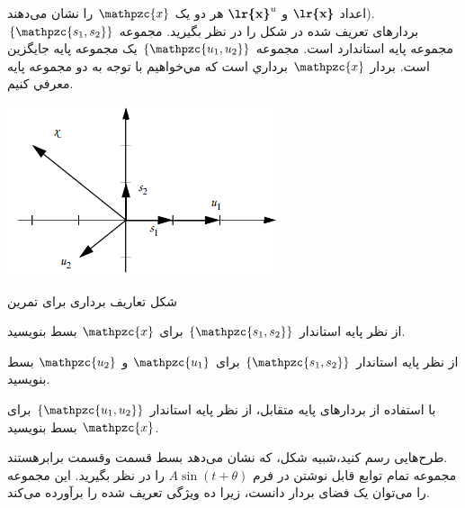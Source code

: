 \documentclass[a4paper,12pt]{report}
\begin{document}
     \hspace{0.5cm}
     اعداد $ \textbf{\lr{x}} $ و
      $ \textbf{\lr{x}}^u $
       هر دو یک $ \mathpzc{x} $ را نشان می‌دهند).\\
       
       
        \hspace{-2.5cm}\textbf{}\hspace{0.6cm}
       بردارهای تعریف شده در شکل  را در نظر بگیرید. مجموعه 
       $ \{\mathpzc{s_1,s_2}\} $
        مجموعه پایه استاندارد است. مجموعه 
        $ \{\mathpzc{u_1,u_2}\} $
         یک مجموعه پایه جایگزین است. بردار $ \mathpzc{x} $ برداري است كه مي‌خواهيم با توجه به دو مجموعه پايه معرفي كنيم.
         \begin{center}
         	\includegraphics[width=8cm, height=5cm]{154}
         	
         	شکل  تعاریف برداری برای تمرین 
         \end{center}
     
     \textbf{}
     از نظر پایه استاندار 
     $ \{\mathpzc{s_1,s_2}\} $
     برای $ \mathpzc{x} $ بسط بنویسید.
     
     \textbf{}
     از نظر پایه استاندار 
     $ \{\mathpzc{s_1,s_2}\} $
     برای $ \mathpzc{u_1} $ و $ \mathpzc{u_2} $ بسط بنویسید.
     
     \textbf{}
     با استفاده از بردارهای پایه متقابل، از نظر پایه استاندار 
     $ \{\mathpzc{u_1,u_2}\} $
     برای $ \mathpzc{x} $ بسط بنویسید.
     
     \textbf{}
     طرح‌هایی رسم کنید،شبیه شکل، که نشان می‌دهد بسط قسمت  وقسمت  برابرهستند.\\
     
     \hspace{-2.5cm}\textbf{}\hspace{0.6cm}
     مجموعه تمام توابع قابل نوشتن در فرم 
     $ A\sin (t+\theta) $
      را در نظر بگیرید. این مجموعه را می‌توان یک فضای بردار دانست، زیرا ده ویژگی تعریف شده را برآورده می‌کند.\\
            
\end{document}
